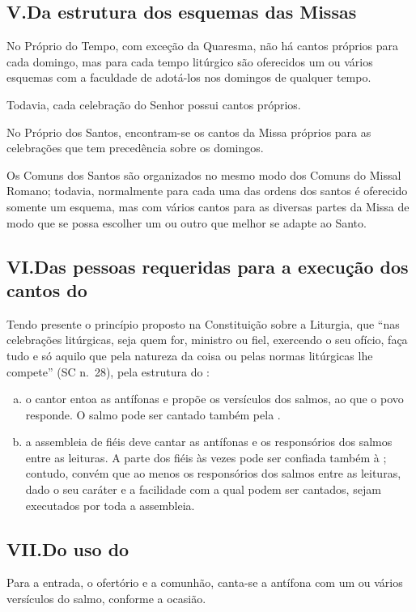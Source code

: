 \subsection{V.\@ Da estrutura dos esquemas das Missas}\label{subsection:praenotanda-5}

 No Próprio do Tempo, com exceção da Quaresma, não há cantos próprios para cada domingo, mas para cada tempo litúrgico são oferecidos um ou vários esquemas com a faculdade de adotá-los nos domingos de qualquer tempo.

Todavia, cada celebração do Senhor possui cantos próprios.

 No Próprio dos Santos, encontram-se os cantos da Missa próprios para as celebrações que tem precedência sobre os domingos.

 Os Comuns dos Santos são organizados no mesmo modo dos Comuns do Missal Romano; todavia, normalmente para cada uma das ordens dos santos é oferecido somente um esquema, mas com vários cantos para as diversas partes da Missa de modo que se possa escolher um ou outro que melhor se adapte ao Santo.

\subsection{VI.\@ Das pessoas requeridas para a execução dos cantos do {\GS}}

 Tendo presente o princípio proposto na Constituição sobre a Liturgia, que ``nas celebrações litúrgicas, seja quem for, ministro ou fiel, exercendo o seu ofício, faça tudo e só aquilo que pela natureza da coisa ou pelas normas litúrgicas lhe compete'' (SC n.\ 28), pela estrutura do {\GS}:
\begin{enumerate}[a)]
  \item o cantor entoa as antífonas e propõe os versículos dos salmos, ao que o povo responde. O salmo pode ser cantado também pela {\Schola}.

  \item a assembleia de fiéis deve cantar as antífonas e os responsórios dos salmos entre as leituras. A parte dos fiéis às vezes pode ser confiada também à {\Schola}; contudo, convém que ao menos os responsórios dos salmos entre as leituras, dado o seu caráter e a facilidade com a qual podem ser cantados, sejam executados por toda a assembleia.
\end{enumerate}

\subsection{VII.\@ Do uso do {\GS}}
 Para a entrada, o ofertório e a comunhão, canta-se a antífona com um ou vários versículos do salmo, conforme a ocasião.

